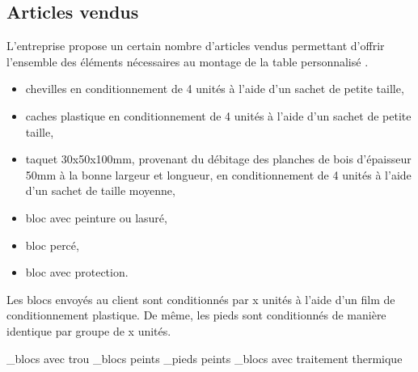\subsection{Articles vendus}

L'entreprise propose un certain nombre d'articles vendus permettant d'offrir
l'ensemble des éléments nécessaires au montage de la table
\og personnalisé \fg{}.

\begin{itemize}
	\item chevilles en conditionnement de 4 unités à l'aide d'un sachet
	de petite taille,
	\item caches plastique en conditionnement de 4 unités à l'aide d'un sachet
	de petite taille,
	\item taquet 30x50x100mm, provenant du débitage des planches de bois
	d'épaisseur 50mm à la bonne largeur et longueur, en conditionnement de 
	4 unités à l'aide d'un sachet de taille moyenne,
	\item bloc avec peinture ou lasuré,
	\item bloc percé,
	\item bloc avec protection.
\end{itemize}

Les blocs envoyés au client sont conditionnés par x unités à l'aide d'un
film de conditionnement plastique.
De même, les pieds sont conditionnés de manière identique par groupe de x
unités.

_blocs avec trou
_blocs peints
_pieds peints 
_blocs avec traitement thermique 
